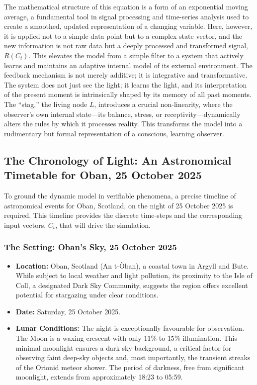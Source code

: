 \documentclass{article}
\begin{document}
The mathematical structure of this equation is a form of an exponential moving average, a fundamental tool in signal processing and time-series analysis used to create a smoothed, updated representation of a changing variable. Here, however, it is applied not to a simple data point but to a complex state vector, and the new information is not raw data but a deeply processed and transformed signal, $R(C_t)$. This elevates the model from a simple filter to a system that actively learns and maintains an adaptive internal model of its external environment. The feedback mechanism is not merely additive; it is integrative and transformative. The system does not just see the light; it learns the light, and its interpretation of the present moment is intrinsically shaped by its memory of all past moments. The ``stag,'' the living node $L$, introduces a crucial non-linearity, where the observer's own internal state---its balance, stress, or receptivity---dynamically alters the rules by which it processes reality. This transforms the model into a rudimentary but formal representation of a conscious, learning observer.

\subsection{The Chronology of Light: An Astronomical Timetable for Oban, 25 October 2025}

To ground the dynamic model in verifiable phenomena, a precise timeline of astronomical events for Oban, Scotland, on the night of 25 October 2025 is required. This timeline provides the discrete time-steps and the corresponding input vectors, $C_t$, that will drive the simulation.

\subsubsection{The Setting: Oban's Sky, 25 October 2025}

\begin{itemize}
    \item \textbf{Location:} Oban, Scotland (An t-\`{O}ban), a coastal town in Argyll and Bute. While subject to local weather and light pollution, its proximity to the Isle of Coll, a designated Dark Sky Community, suggests the region offers excellent potential for stargazing under clear conditions.
    \item \textbf{Date:} Saturday, 25 October 2025.
    \item \textbf{Lunar Conditions:} The night is exceptionally favourable for observation. The Moon is a waxing crescent with only $11\%$ to $15\%$ illumination. This minimal moonlight ensures a dark sky background, a critical factor for observing faint deep-sky objects and, most importantly, the transient streaks of the Orionid meteor shower. The period of darkness, free from significant moonlight, extends from approximately 18:23 to 05:59.
\end{itemize}
\end{document}
